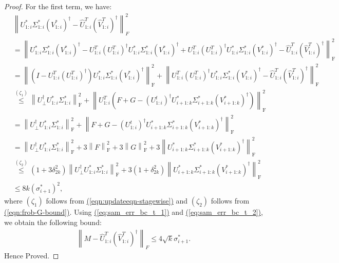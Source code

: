 \documentclass[11pt]{article}
\renewcommand{\eqref}[1]{\hyperref[#1]{(\ref*{#1})}}
\theoremstyle{plain}
\theoremstyle{definition}
\newcommand{\frob}[1]{\left\| {#1} \right\|_\text{F}}
\newcommand{\Ut}{U^{t}}
\newcommand{\Vo}{V^*}
\newcommand{\So}{\Sigma^*}
\newcommand{\Uo}{U^*}
\newcommand{\Vw}{\widehat{V}}
\newcommand{\Uw}{\widehat{U}}
\begin{document}
\begin{proof}
For the first term, we have:
\begin{align}
	&\left\| \Uo_{1:i}\So_{1:i}\left(\Vo_{1:i}\right)^{\dag} - \Uw^T_{1:i}(\Vw^T_{1:i})^{\dag}\right\|_F^2 \nonumber\\
	&= \frob{\Uo_{1:i}\So_{1:i}\left(\Vo_{1:i}\right)^{\dag} - U^T_{1:i}\left(U^T_{1:i}\right)^{\dag}\Uo_{1:i}\So_{1:i}\left(\Vo_{1:i}\right)^{\dag}
		+ U^T_{1:i}\left(U^T_{1:i}\right)^{\dag}\Uo_{1:i}\So_{1:i}\left(\Vo_{1:i}\right)^{\dag} - \Uw^T_{1:i}(\Vw^T_{1:i})^{\dag}}^2 \nonumber\\
	&= \frob{\left(I-U^T_{1:i}\left(U^T_{1:i}\right)^{\dag}\right)\Uo_{1:i}\So_{1:i}\left(\Vo_{1:i}\right)^{\dag} }^2
		+ \frob{U^T_{1:i}\left(U^T_{1:i}\right)^{\dag}\Uo_{1:i}\So_{1:i}\left(\Vo_{1:i}\right)^{\dag} - \Uw^T_{1:i}(\Vw^T_{1:i})^{\dag}}^2 \nonumber\\
	&\stackrel{(\zeta_1)}{\leq} \frob{U_{\perp}^{\dag} \Uo_{1:i}\So_{1:i}}^2 + \frob{U_{1:i}^T\left(F+G-\left(\Ut_{1:i}\right)^{\dag}\Uo_{i+1:k}\So_{i+1:k}(\Vo_{i+1:k})^\dag\right)}^2 \nonumber\\
	&= \frob{U_{\perp}^{\dag} \Uo_{1:i}\So_{1:i}}^2 + \frob{F+G-\left(\Ut_{1:i}\right)^{\dag}\Uo_{i+1:k}\So_{i+1:k}(\Vo_{i+1:k})^\dag}^2 \nonumber\\
	&= \frob{U_{\perp}^{\dag} \Uo_{1:i}\So_{1:i}}^2 + 3\frob{F}^2+3\frob{G}^2+3\frob{\Uo_{i+1:k}\So_{i+1:k}(\Vo_{i+1:k})^\dag}^2 \nonumber\\
	&\stackrel{(\zeta_2)}{\leq} (1+3\delta_{2k}^2) \frob{U_{\perp}^{\dag} \Uo_{1:i}\So_{1:i}}^2 + 3(1+\delta_{2k}^2) \frob{\Uo_{i+1:k}\So_{i+1:k}(\Vo_{i+1:k})^\dag}^2 \nonumber\\
	&\leq 8k (\sigma_{i+1}^*)^2,
\label{eq:sam_err_bc_t_2}
\end{align}
where $(\zeta_1)$ follows from \eqref{eqn:updateeqn-stagewise} and $(\zeta_2)$ follows from \eqref{eqn:frob-G-bound}.
Using \eqref{eq:sam_err_bc_t_1} and \eqref{eq:sam_err_bc_t_2}, we obtain the following bound:
\begin{align}\label{eq:sam_err_bc_t}
  \left\|M - \Uw^T_{1:i}(\Vw^T_{1:i})^{\dag}\right\|_F \leq 4\sqrt{k} \sigma_{i+1}^*.
\end{align}
Hence Proved.
\end{proof}
\end{document}
